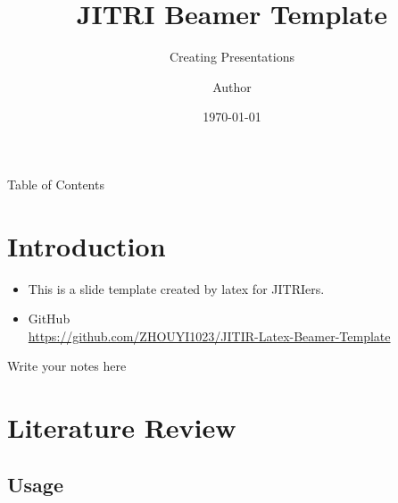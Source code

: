\documentclass{libs/JITRI_format}
\title[JITRI Beamer Template]{\huge\textbf{JITRI Beamer Template}}
\subtitle{Creating Presentations}
\author{Author}
\institute[JITRI]{
    \normalsize{\email{author@xxx.xxx
    .xx}}
    \newline
    \department{Institute of Deep Perception Technology}
    \newline
    \university{Jiangsu Industrial Technology Research Institute}
}
\date{\today}
\begin{document}


\begin{frame}{}
    \maketitle
\end{frame}

\begin{frame}{Table of Contents}
    \begin{multicols}{2}
        \tableofcontents
    \end{multicols}
\end{frame}

\section{Introduction}

\begin{frame}
    \begin{itemize}[<+-| alert@+>] %
    	\item This is a slide template created by latex for JITRIers.
        \item GitHub \\ \url{https://github.com/ZHOUYI1023/JITIR-Latex-Beamer-Template}
    \end{itemize}
    
    \begin{note}
        {Write your notes here}
    \end{note}
\end{frame}

\section{Literature Review}

\subsection{Usage}
\end{document}

